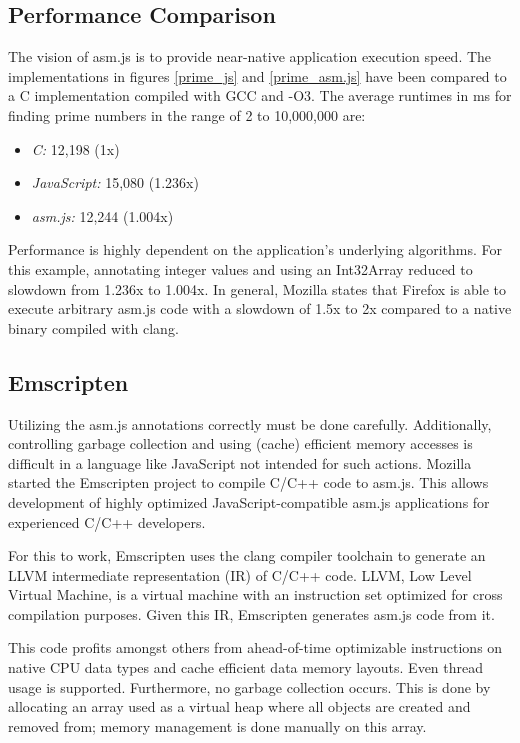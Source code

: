 \subsection{Performance Comparison}

The vision of asm.js is to provide near-native application execution speed. The implementations in figures \ref{prime_js} and \ref{prime_asm.js} have been compared to a C implementation compiled with GCC and -O3. The average runtimes in ms for finding prime numbers in the range of 2 to 10,000,000 are:

\begin{itemize}
\item \textit{C:} 12,198 (1x)
\item \textit{JavaScript:} 15,080 (1.236x)
\item \textit{asm.js:} 12,244 (1.004x)
\end{itemize}

Performance is highly dependent on the application's underlying algorithms. For this example, annotating integer values and using an Int32Array reduced to slowdown from 1.236x to 1.004x. In general, Mozilla states that Firefox is able to execute arbitrary asm.js code with a slowdown of 1.5x to 2x compared to a native binary compiled with clang. \cite{asm.js_spec} \cite{asm.js_comp}


\subsection{Emscripten}

Utilizing the asm.js annotations correctly must be done carefully. Additionally, controlling garbage collection and using (cache) efficient memory accesses is difficult in a language like JavaScript not intended for such actions. Mozilla started the Emscripten project to compile C/C++ code to asm.js. This allows development of highly optimized JavaScript-compatible asm.js applications for experienced C/C++ developers.

For this to work, Emscripten uses the clang compiler toolchain to generate an LLVM intermediate representation (IR) of C/C++ code. LLVM, Low Level Virtual Machine, is a virtual machine with an instruction set optimized for cross compilation purposes. Given this IR, Emscripten generates asm.js code from it.

This code profits amongst others from ahead-of-time optimizable instructions on native CPU data types and cache efficient data memory layouts. Even thread usage is supported. Furthermore, no garbage collection occurs. This is done by allocating an array used as a virtual heap where all objects are created and removed from; memory management is done manually on this array. \cite{asm.js_spec}

